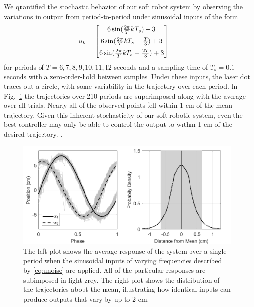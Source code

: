 We quantified the stochastic behavior of our soft robot system by observing the variations in output from period-to-period under sinusoidal inputs of the form
\begin{align} 
    u_k &= \begin{bmatrix} 6 \sin ( \frac{2 \pi}{T} k T_s ) + 3 \vspace{5pt} \\ 
    6 \sin ( \frac{2 \pi}{T} k T_s - \frac{T}{3} ) + 3 \vspace{5pt} \\ 
    6 \sin ( \frac{2 \pi}{T} k T_s  - \frac{2T}{3}) + 3\end{bmatrix}
    \label{eq:unoise}
\end{align}
for periods of $T = 6,7,8,9,10,11,12$ seconds and a sampling time of $T_s = 0.1$ seconds with a zero-order-hold between samples. 
Under these inputs, the laser dot traces out a circle, with some variability in the trajectory over each period.
In Fig.~\ref{fig:noise} the trajectories over 210 periods are superimposed along with the average over all trials.
Nearly all of the observed points fell within 1 cm of the mean trajectory.
Given this inherent stochasticity of our soft robotic system, even the best controller may only be able to control the output to within 1 cm of the desired trajectory.
.

\begin{figure}
    \centering
    \includegraphics[width=\linewidth]{figures/noise.png}
    \caption{The left plot shows the average response of the system over a single period when the sinusoidal inputs of varying frequencies described by \eqref{eq:unoise} are applied. All of the particular responses are subimposed in light grey.
    The right plot shows the distribution of the trajectories about the mean, illustrating how identical inputs can produce outputs that vary by up to 2 cm.}
    \label{fig:noise}
\end{figure}

